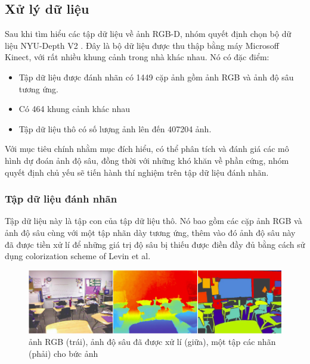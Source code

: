 \subsection{Xử lý dữ liệu}

Sau khi tìm hiểu các tập dữ liệu về ảnh RGB-D, nhóm quyết định chọn bộ dữ liệu NYU-Depth V2 \cite{silberman2012indoor}. Đây là bộ dữ liệu được thu thập bằng máy Microsoff Kinect, với rất nhiều khung cảnh trong nhà khác nhau. Nó có đặc điểm:
\begin{itemize}
\item Tập dữ liệu được đánh nhãn có 1449 cặp ảnh gồm ảnh RGB và ảnh độ sâu tương ứng.
\item Có 464 khung cảnh khác nhau
\item Tập dữ liệu thô có số lượng ảnh lên đến 407204 ảnh.
\end{itemize}
Với mục tiêu chính nhằm mục đích hiểu, có thể phân tích và đánh giá các mô hình dự đoán ảnh độ sâu, đồng thời với những khó khăn về phần cứng, nhóm quyết định chủ yếu sẽ tiến hành thí nghiệm trên tập dữ liệu đánh nhãn.
\subsubsection{Tập dữ liệu đánh nhãn}
Tập dữ liệu này là tập con của tập dữ liệu thô. Nó bao gồm các cặp ảnh RGB và ảnh độ sâu cùng với một tập nhãn dày tương ứng, thêm vào đó ảnh độ sâu này đã được tiền xử lí để những giá trị độ sâu bị thiếu được điền đầy đủ bằng cách sử dụng  colorization scheme of Levin et al. \cite{nyu}
\begin{center}
         \begin{figure}[H]
         \begin{center}
           \includegraphics[scale=0.5]{image/nyu}
          \end{center}
          \caption{ảnh RGB (trái), ảnh độ sâu đã được xử lí (giữa), một tập các nhãn (phải) cho bức ảnh }
          \label{ref_sigmoid}
          \end{figure}
 \end{center}
 
